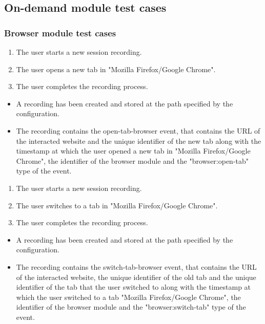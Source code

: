 \subsection{On-demand module test cases}

\subsubsection{Browser module test cases}
\begin{tests}
	{\begin{enumerate}
		\item The \gls{user} starts a new \gls{session} recording.
		\item The \gls{user} opens a new tab in "Mozilla Firefox/Google Chrome".
		\item The \gls{user} completes the recording process.
	\end{enumerate}}
	{\begin{itemize}
		\item A recording has been created and stored at the path specified by the configuration.
		\item The recording contains the open-tab-browser \gls{event},  that contains the URL of the interacted website and the unique identifier of the new tab along with the timestamp at which the \gls{user} opened a new tab in "Mozilla Firefox/Google Chrome", the identifier of the \gls{browser} module and the "browser:open-tab" type of the event.
	\end{itemize}}
\newpage
	{\begin{enumerate}
		\item The \gls{user} starts a new \gls{session} recording.
		\item The \gls{user} switches to a tab in "Mozilla Firefox/Google Chrome".
		\item The \gls{user} completes the recording process.
	\end{enumerate}}
	{\begin{itemize}
		\item A recording has been created and stored at the path specified by the configuration.
		\item The recording contains the switch-tab-browser \gls{event},  that contains the URL of the interacted website, the unique identifier of the old tab and the unique identifier of the tab that the \gls{user} switched to along with the timestamp at which the \gls{user} switched to a tab "Mozilla Firefox/Google Chrome", the identifier of the \gls{browser} module and the "browser:switch-tab" type of the event.
	\end{itemize}}
	

\end{tests}
